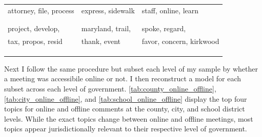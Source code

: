 \begin{table}[H]
{\begin{tabular}{lll}
          attorney, file, process &  express, sidewalk & staff, online, learn \\ \\[-1.8ex]
          \hline\\
          project, develop,      & maryland, trail,        & spoke, regard,  \\
          tax, propos, resid &    thank, event & favor, concern, kirkwood\\ \\[-1.8ex]
          \\[-1.8ex]\hline 
              \hline \\[-1.8ex]                                  
          \end{tabular}
      }
    \end{table}

    
    Next I follow the same procedure but subset each level of my sample by whether a meeting was accessibile online or not. I then reconstruct a model for each subset across each level of government. \autoref{tab:county_online_offline}, \autoref{tab:city_online_offline}, and \autoref{tab:school_online_offline} display the top four topics for online and offline comments at the county, city, and school district levels. While the exact topics change between online and offline meetings, most topics appear jurisdictionally relevant to their respective level of government. 
    
    
    
